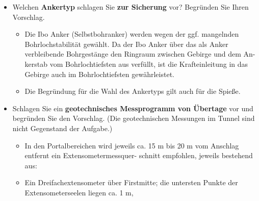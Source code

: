 \documentclass[fleqn,twoside]{article}
\begin{document}
\begin{small}
\begin{itemize}
\begin{itemize}[label={$\blacktriangleright$}]
\begin{itemize}[label={$\blacktriangleright$}]
        (z. B. Styropor) gegen Einspritzen geschützt werden.
        \item Die außen liegenden Ulmen und die Kalotte im Kern werden mit Ibo Ankern (1 Stück/ 1,5 bis 3 m², ca. 6
        m lang) gesichert.
        \item Im Kernausbruch werden als vorauseilende Sicherung Spieße (Ibo) erforderlich (z. B. 6 m lang jeden
        zweiten Abschlag bzw. 4,5 m lang in jedem Abstand.) mit einem Abstand in Umfangsrichtung von max.
        40 cm.
        \item Unter der Sohle des Sohlvortriebs der Ulmenstollen und des Kerns wird jeweils eine Baudränage (Vollsi-
        cker- oder Teilsickerrohr in einer mit Vlies ummantelten, ca. 30 cm x 30 cm großen Sickerpackung aus
        Kies) verlegt. Alle ca. 50 m bis 80 m wird die Kiespackung um das Sickerrohr auf ca. 1 m Länge durch
        Beton ersetzt.
        \end{itemize}
        \item Welchen \textbf{Ankertyp} schlagen Sie \textbf{zur Sicherung} vor? Begründen Sie Ihren Vorschlag.
        \begin{itemize}[label={$\blacktriangleright$}]
        \item Die Ibo Anker (Selbstbohranker) werden wegen der ggf. mangelnden Bohrlochstabilität gewählt. Da der
        Ibo Anker über das als Anker verbleibende Bohrgestänge den Ringraum zwischen Gebirge und dem An-
        kerstab vom Bohrlochtiefsten aus verfüllt, ist die Krafteinleitung in das Gebirge auch im Bohrlochtiefsten
        gewährleistet.
        \item Die Begründung für die Wahl des Ankertyps gilt auch für die Spieße.
        \end{itemize}
        \item Schlagen Sie ein \textbf{geotechnisches Messprogramm von Übertage} vor und begründen Sie den Vorschlag. (Die geotechnischen Messungen im Tunnel sind nicht Gegenstand der Aufgabe.)
        \begin{itemize}[label={$\blacktriangleright$}]
        \item In den Portalbereichen wird jeweils ca. 15 m bis 20 m vom Anschlag entfernt ein Extensometermessquer-
        schnitt empfohlen, jeweils bestehend aus:
        \item  Ein Dreifachextensometer über Firstmitte; die untersten Punkte der Extensometerseelen liegen ca. 1 m,

\end{itemize}
\end{itemize}
\end{itemize}
\end{small}
\end{document}
